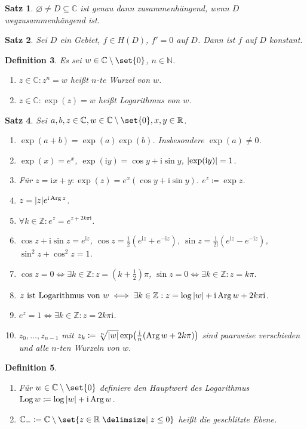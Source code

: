 \documentclass[a4paper]{article}
\newcounter{Sec}
\theoremstyle{marginbreak}
\newtheorem{definition}{Definition}[Sec]
\newtheorem{satz}[definition]{Satz}
\newcommand{\R}{\mathbb{R}}
\newcommand{\C}{\mathbb{C}}
\renewcommand{\i}{\mathrm{i}}
\DeclareMathOperator{\Arg}{Arg}
\DeclareMathOperator{\Log}{Log}
\begin{document}
	\begin{satz}
		$\varnothing\neq D\subseteq\C$ ist genau dann zusammenhängend, wenn $D$ wegzusammenhängend ist.
	\end{satz}
	\begin{satz}
		Sei $D$ ein Gebiet, $f\in H(D)$, $f'=0$ auf $D$. Dann ist $f$ auf $D$ konstant.
	\end{satz}
	\begin{definition}
		Es sei $w\in\C\setminus\set{0}$, $n\in\mathbb{N}$.
		\begin{enumerate}[label=(\alph*)]
			\item $z\in\C: z^n=w$ heißt $n$-te Wurzel von $w$.
			\item $z\in\C: \exp(z)=w$ heißt Logarithmus von $w$.
		\end{enumerate}
	\end{definition}
	\begin{satz}
		Sei $a, b, z\in\C, w\in \C\setminus\set{0}, x, y\in\R$.
		\begin{enumerate}[label=(\alph*)]
			\item $\exp(a+b)=\exp(a)\exp(b)$. Insbesondere $\exp(a)\neq 0$.
			\item $\exp(x)=e^x$, $\exp(\i y) = \cos y + \i\sin y$, $\abs{\exp(\i y)} = 1$.
			\item Für $z=\i x+y:\exp(z)=e^x(\cos y +\i\sin y)$. $e^z\coloneqq\exp{z}$.
			\item $z=\abs{z}e^{\i\Arg z}$.
			\item $\forall k\in\mathbb{Z}:e^z=e^{z+2k\pi\i}$.
			\item $\cos z+\i\sin z = e^{\i z}$, $\cos z=\frac{1}{2}(e^{\i z}+e^{-\i z})$, $\sin z = \frac{1}{2\i}(e^{\i z}-e^{-\i z})$,
				$\sin^2 z + \cos^2 z= 1$.
			\item $\cos z = 0\iff\exists k\in\mathbb{Z}: z=(k+\frac{1}{2})\pi$, $\sin z = 0\iff\exists k\in\mathbb{Z}:z=k\pi$.
			\item $z~\text{ist Logarithmus von $w$}\iff\exists k\in\mathbb{Z}: z = \log\abs{w}+\i\Arg w+2k\pi\i$.
			\item $e^z=1\iff\exists k\in\mathbb{Z}:z=2k\pi\i$.
			\item $z_0,\ldots, z_{n-1}$ mit $z_k\coloneqq\sqrt[n]{\abs{w}}\exp(\frac{\i}{n}(\Arg w+2k\pi))$ sind paarweise
				verschieden und alle $n$-ten Wurzeln von $w$.
		\end{enumerate}
	\end{satz}
	\begin{definition}
		\begin{enumerate}[label=(\alph*)]
			\item Für $w\in\C\setminus\set{0}$ definiere den Hauptwert des Logarithmus $\Log w\coloneqq \log\abs{w}+\i\Arg w$.
			\item $\C_-\coloneqq\C\setminus\set{z\in\R\given z\leq 0}$ heißt die geschlitzte Ebene.
		\end{enumerate}
	\end{definition}
\end{document}

